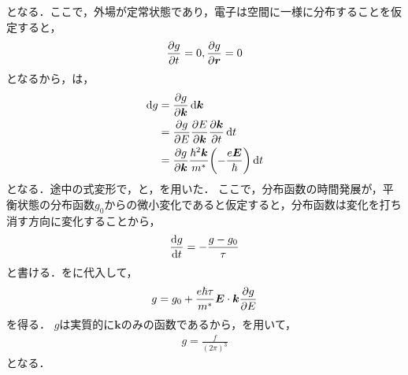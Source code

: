 \documentclass{report}
\begin{document}
      となる．ここで，外場が定常状態であり，電子は空間に一様に分布することを仮定すると，
      \begin{align}
        \pdv{g}{t} = 0, \pdv{g}{\bm{r}} = 0
      \end{align}
      となるから，は，
      \begin{align}
        \dd{g} &= \pdv{g}{\bm{k}}\dd{\bm{k}} \\ 
        &= \pdv{g}{E}\pdv{E}{\bm{k}}\pdv{\bm{k}}{t}\dd{t} \\
        &= \pdv{g}{\bm{k}}\frac{\hbar^2\bm{k}}{m^*}\qty(-\frac{e\bm{E}}{\hbar})\dd{t} \label{boltzmann-total-diff-2}
      \end{align}
      となる．途中の式変形で，と，を用いた．
      ここで，分布函数の時間発展が，平衡状態の分布函数$g_0$からの微小変化であると仮定すると，分布函数は変化を打ち消す方向に変化することから，
      \begin{align}
        \dv{g}{t} = -\frac{g - g_0}{\tau} \label{boltzmann-time-evolution}
      \end{align}
      と書ける．をに代入して，
      \begin{align}
        g = g_0 + \frac{e\hbar\tau}{m^*}\bm{E}\cdot \bm{k}\pdv{g}{E}
      \end{align}
      を得る．
      $g$は実質的に$\bm{k}$のみの函数であるから，を用いて，
      \begin{align}
        g = \frac{f}{(2\pi)^3} \label{g-f}
      \end{align}
      となる．
\end{document}
